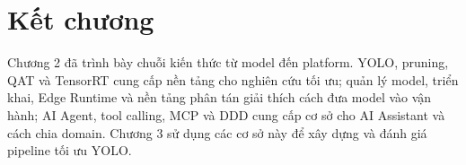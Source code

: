 \section{Kết chương}

Chương 2 đã trình bày chuỗi kiến thức từ model đến platform. YOLO, pruning, QAT
và TensorRT cung cấp nền tảng cho nghiên cứu tối ưu; quản lý model, triển khai,
Edge Runtime và nền tảng phân tán giải thích cách đưa model vào vận hành; AI
Agent, tool calling, MCP và DDD cung cấp cơ sở cho AI Assistant và cách chia domain.
Chương 3 sử dụng các cơ sở này để xây dựng và đánh giá pipeline tối ưu YOLO.